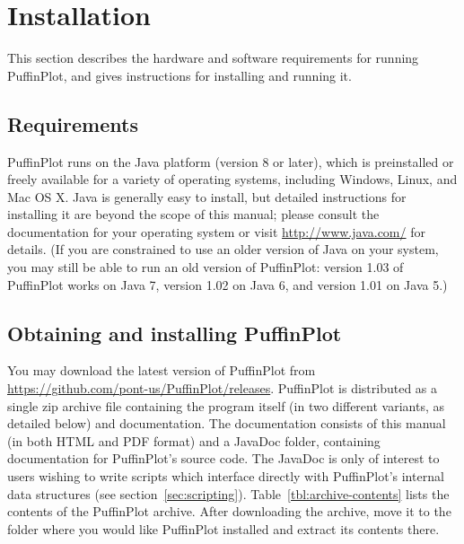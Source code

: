 \documentclass[a4paper,british]{article}
\begin{document}
\section{Installation}

This section describes the hardware and software requirements for
running PuffinPlot, and gives instructions for installing and running
it.

\subsection{Requirements}

PuffinPlot runs on the Java platform (version 8 or later), which is
preinstalled or freely available for a variety of operating systems,
including Windows, Linux, and Mac OS X. Java is generally easy to
install, but detailed instructions for installing it are beyond the
scope of this manual; please consult the documentation for your
operating system or visit \url{http://www.java.com/} for details. (If
you are constrained to use an older version of Java on your system, you
may still be able to run an old version of PuffinPlot: version 1.03 of
PuffinPlot works on Java 7, version 1.02 on Java 6, and version 1.01 on
Java 5.)

\subsection{Obtaining and installing PuffinPlot}

You may download the latest version of PuffinPlot from
\url{https://github.com/pont-us/PuffinPlot/releases}. PuffinPlot is
distributed as a single zip archive file containing the program itself
(in two different variants, as detailed below) and documentation. The
documentation consists of this manual (in both HTML and PDF format) and
a JavaDoc folder, containing documentation for PuffinPlot's source code.
The JavaDoc is only of interest to users wishing to write scripts which
interface directly with PuffinPlot's internal data structures (see
section~\ref{sec:scripting}). Table~\ref{tbl:archive-contents} lists the
contents of the PuffinPlot archive. After downloading the archive, move
it to the folder where you would like PuffinPlot installed and extract
its contents there.
\end{document}
